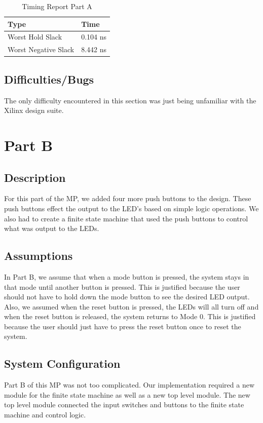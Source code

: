 \documentclass[letterpaper, 10 pt, conference]{IEEEconf}  %
\begin{document}
\begin{table}[H]
\centering
\caption{Timing Report Part A}
\label{table_example}
\begin{tabular}{|l|l|}
\hline
\rowcolor[HTML]{EFEFEF} 
Type                 & Time     \\ \hline
Worst Hold Slack     & 0.104 ns \\ \hline
Worst Negative Slack & 8.442 ns \\ \hline
\end{tabular}
\end{table}

\subsection{Difficulties/Bugs}
The only difficulty encountered in this section was just being unfamiliar with the Xilinx design suite.


\section{Part B}
\subsection{Description}
For this part of the MP, we added four more push buttons to the design. These push buttons effect the output to the LED's based on simple logic operations. We also had to create a finite state machine that used the push buttons to control what was output to the LEDs. 

\subsection{Assumptions}
In Part B, we assume that when a mode button is pressed, the system stays in that mode until another button is pressed. This is justified because the user should not have to hold down the mode button to see the desired LED output. Also, we assumed when the reset button is pressed, the LEDs will all turn off and when the reset button is released, the system returns to Mode 0. This is justified because the user should just have to press the reset button once to reset the system. 


\subsection{System Configuration}
Part B of this MP was  not too complicated. Our implementation required a new module for the finite state machine as well as a new top level module. The new top level module connected the input switches and buttons to the finite state machine and control logic. 
\end{document}
